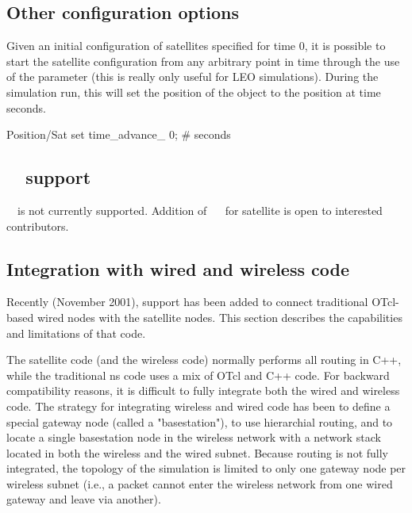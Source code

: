 
\subsection{Other configuration options}
\label{sec:satellite/usage/other}

Given an initial configuration of satellites specified for time $0$, 
it is possible to start the 
satellite configuration from any arbitrary point in time through the use of the
 parameter (this is really only useful for LEO
simulations). During the simulation run, this will set the position of 
the object to the position at time
 seconds.
\begin{program}
Position/Sat set time_advance_ 0; # seconds          
\end{program}



\subsection{\nam~~support}
\label{sec:satellite/usage/nam}
\nam~~is not currently supported.  Addition of \nam~~ for satellite
is open to interested contributors.


\subsection{Integration with wired and wireless code}
\label{sec:satellite/usage/integration}

Recently (November 2001), support has been added to connect traditional
OTcl-based wired nodes with the satellite nodes.  This section describes
the capabilities and limitations of that code.

The satellite code (and the wireless code) normally performs all routing 
in C++, while the traditional ns code uses a mix of OTcl and C++ code.   
For backward compatibility reasons, it is difficult to fully integrate
both the wired and wireless code.   The strategy for integrating wireless 
and wired code has been to define a special gateway node (called a 
"basestation"), to use hierarchial routing, and to locate a single basestation 
node in the wireless network with a network stack located in both the
wireless and the wired subnet.  Because routing is not fully integrated, 
the topology of the simulation is limited to only one gateway node per
wireless subnet (i.e., a packet cannot enter the wireless network from 
one wired gateway and leave via another).

